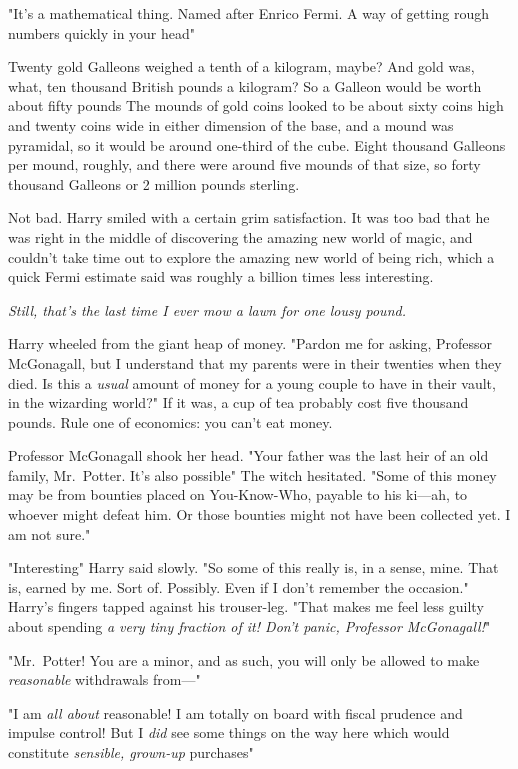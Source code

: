 "It's a mathematical thing. Named after Enrico Fermi. A way of getting rough
numbers quickly in your head{\el}"

Twenty gold Galleons weighed a tenth of a kilogram, maybe? And gold was, what,
ten thousand British pounds a kilogram? So a Galleon would be worth about fifty
pounds{\el} The mounds of gold coins looked to be about sixty coins high and
twenty coins wide in either dimension of the base, and a mound was pyramidal,
so it would be around one-third of the cube. Eight thousand Galleons per mound,
roughly, and there were around five mounds of that size, so forty thousand
Galleons or 2 million pounds sterling.

Not bad. Harry smiled with a certain grim satisfaction. It was too bad that he
was right in the middle of discovering the amazing new world of magic, and
couldn't take time out to explore the amazing new world of being rich, which a
quick Fermi estimate said was roughly a billion times less interesting.

\emph{Still, that's the last time I ever mow a lawn for one lousy pound.}

Harry wheeled from the giant heap of money. "Pardon me for asking, Professor
McGonagall, but I understand that my parents were in their twenties when they
died. Is this a \emph{usual} amount of money for a young couple to have in
their vault, in the wizarding world?" If it was, a cup of tea probably cost
five thousand pounds. Rule one of economics: you can't eat money.

Professor McGonagall shook her head. "Your father was the last heir of an old
family, Mr.~Potter. It's also possible{\el}" The witch hesitated. "Some of
this money may be from bounties placed on You-Know-Who, payable to his ki---ah,
to whoever might defeat him. Or those bounties might not have been collected
yet. I am not sure."

"Interesting{\el}" Harry said slowly. "So some of this really is, in a
sense, mine. That is, earned by me. Sort of. Possibly. Even if I don't remember
the occasion." Harry's fingers tapped against his trouser-leg. "That makes me
feel less guilty about spending \emph{a very tiny fraction of it! Don't panic,
Professor McGonagall!}"

"Mr.~Potter! You are a minor, and as such, you will only be allowed to make
\emph{reasonable} withdrawals from---"

"I am \emph{all about} reasonable! I am totally on board with fiscal prudence
and impulse control! But I \emph{did} see some things on the way here which
would constitute \emph{sensible, grown-up} purchases{\el}"

